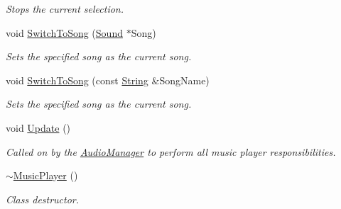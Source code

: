 \begin{DoxyCompactItemize}
\begin{DoxyCompactList}\small\item\em Stops the current selection. \item\end{DoxyCompactList}\item 
void \hyperlink{classMezzanine_1_1Audio_1_1MusicPlayer_ab5e7bb1fa75ff93d122e1c934f1038ce}{SwitchToSong} (\hyperlink{classMezzanine_1_1Audio_1_1Sound}{Sound} $\ast$Song)
\begin{DoxyCompactList}\small\item\em Sets the specified song as the current song. \item\end{DoxyCompactList}\item 
void \hyperlink{classMezzanine_1_1Audio_1_1MusicPlayer_ae7addc8338ac8b6bdff03d2742343b2b}{SwitchToSong} (const \hyperlink{namespaceMezzanine_acf9fcc130e6ebf08e3d8491aebcf1c86}{String} \&SongName)
\begin{DoxyCompactList}\small\item\em Sets the specified song as the current song. \item\end{DoxyCompactList}\item 
\hypertarget{classMezzanine_1_1Audio_1_1MusicPlayer_ae03bceb937bf8d30ada98d5b56b189e9}{
void \hyperlink{classMezzanine_1_1Audio_1_1MusicPlayer_ae03bceb937bf8d30ada98d5b56b189e9}{Update} ()}
\label{classMezzanine_1_1Audio_1_1MusicPlayer_ae03bceb937bf8d30ada98d5b56b189e9}

\begin{DoxyCompactList}\small\item\em Called on by the \hyperlink{classMezzanine_1_1AudioManager}{AudioManager} to perform all music player responsibilities. \item\end{DoxyCompactList}\item 
\hypertarget{classMezzanine_1_1Audio_1_1MusicPlayer_a024b362ff5971e650393c3409a6d7a0f}{
\hyperlink{classMezzanine_1_1Audio_1_1MusicPlayer_a024b362ff5971e650393c3409a6d7a0f}{$\sim$MusicPlayer} ()}
\label{classMezzanine_1_1Audio_1_1MusicPlayer_a024b362ff5971e650393c3409a6d7a0f}

\begin{DoxyCompactList}\small\item\em Class destructor. \item\end{DoxyCompactList}\end{DoxyCompactItemize}
